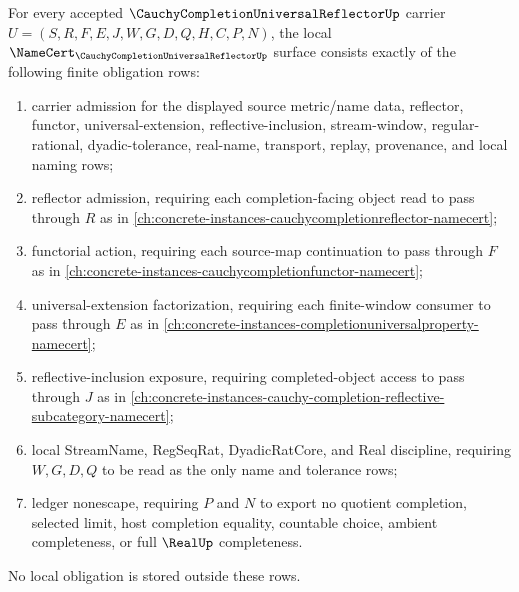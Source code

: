 \begin{theorem}
\label{thm:cauchy-completion-universal-reflector-namecert-obligations}
For every accepted $\CauchyCompletionUniversalReflectorUp$ carrier $U=(S,R,F,E,J,W,G,D,Q,H,C,P,N)$, the local $\NameCert_{\CauchyCompletionUniversalReflectorUp}$ surface consists exactly of the following finite obligation rows:
\begin{enumerate}
\item carrier admission for the displayed source metric/name data, reflector, functor, universal-extension, reflective-inclusion, stream-window, regular-rational, dyadic-tolerance, real-name, transport, replay, provenance, and local naming rows;
\item reflector admission, requiring each completion-facing object read to pass through $R$ as in \autoref{ch:concrete-instances-cauchycompletionreflector-namecert};
\item functorial action, requiring each source-map continuation to pass through $F$ as in \autoref{ch:concrete-instances-cauchycompletionfunctor-namecert};
\item universal-extension factorization, requiring each finite-window consumer to pass through $E$ as in \autoref{ch:concrete-instances-completionuniversalproperty-namecert};
\item reflective-inclusion exposure, requiring completed-object access to pass through $J$ as in \autoref{ch:concrete-instances-cauchy-completion-reflective-subcategory-namecert};
\item local StreamName, RegSeqRat, DyadicRatCore, and Real discipline, requiring $W,G,D,Q$ to be read as the only name and tolerance rows;
\item ledger nonescape, requiring $P$ and $N$ to export no quotient completion, selected limit, host completion equality, countable choice, ambient completeness, or full $\RealUp$ completeness.
\end{enumerate}
No local obligation is stored outside these rows.
\end{theorem}
